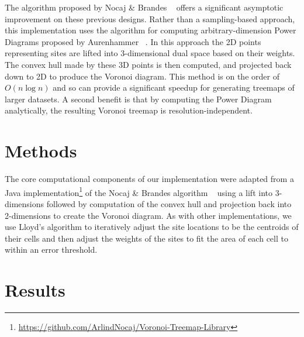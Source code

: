 \documentclass{acm_proc_article-sp} \usepackage{cite}
\begin{document}
The algorithm proposed by Nocaj \& Brandes ~\cite{nocaj:faster} offers
a significant asymptotic improvement on these previous designs. Rather
than a sampling-based approach, this implementation uses the algorithm
for computing arbitrary-dimension Power Diagrams proposed by
Aurenhammer ~\cite{aurenhammer:power}. In this approach the 2D points
representing sites are lifted into 3-dimensional dual space based on
their weights. The convex hull made by these 3D points is then
computed, and projected back down to 2D to produce the Voronoi
diagram. This method is on the order of $O(n \log n)$ and so can
provide a significant speedup for generating treemaps of larger
datasets. A second benefit is that by computing the Power Diagram analytically,
the resulting Voronoi treemap is resolution-independent.

\section{Methods}
\label{sec:methods}
The core computational components of our implementation were adapted
from a Java implementation\footnote{\url{https://github.com/ArlindNocaj/Voronoi-Treemap-Library}}
 of the Nocaj \& Brandes algorithm
~\cite{nocaj:faster} using a lift into 3-dimensions followed by
computation of the convex hull and projection back into 2-dimensions
to create the Voronoi diagram. As with other implementations, we use
Lloyd's algorithm to iteratively adjust the site locations to be the
centroids of their cells and then adjust the weights of the sites to
fit the area of each cell to within an error threshold.

\section{Results}
\label{sec:results}
\end{document}
